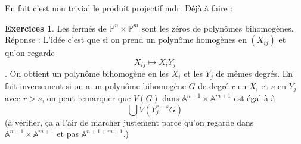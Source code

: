 \documentclass[a4paper,12pt]{book}
\newcommand{\A}{\mathbb{A}}
\renewcommand{\Pr}{\mathbb{P}}
\theoremstyle{plain}
\theoremstyle{definition}
\newtheorem{exo}[subsection]{Exercices}
\theoremstyle{remark}
\begin{document}
En fait c'est non trivial le produit projectif mdr. Déjà à faire :
\begin{exo}
    Les fermés de $\Pr^n\times \Pr^m$ sont les zéros de polynômes 
    bihomogènes. Réponse : L'idée c'est que si on prend un polynôme 
    homogènes en $(X_{ij})$ et qu'on regarde \[X_{ij}\mapsto X_iY_j\]. 
    On obtient un polynôme bihomogène en les $X_i$ et les $Y_j$ de 
    mêmes degrés. En fait inversement si on a un polynôme bihomogène
    $G$ de degré $r$ en $X_i$ et $s$ en $Y_j$ avec $r>s$, on peut 
    remarquer que $V(G)$ dans $\A^{n+1}\times \A^{m+1}$ est égal à 
    à \[\bigcup V(Y_j^{r-s} G)\]
    (à vérifier, ça a l'air de marcher justement parce qu'on regarde
    dans $\A^{n+1}\times \A^{m+1}$ et pas $\A^{n+1+m+1}$.)
\end{exo}



\printbibliography
\end{document}
